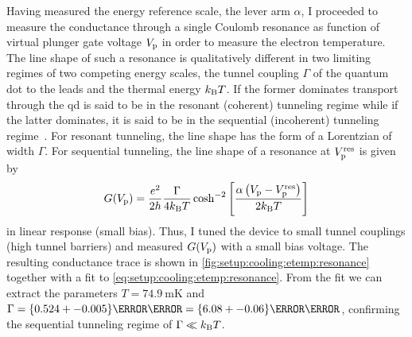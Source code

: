 Having measured the energy reference scale, the lever arm $\alpha$, I proceeded to measure the conductance through a single Coulomb resonance as function of virtual plunger gate voltage $V_{\mathrm{p}}$ in order to measure the electron temperature.
The line shape of such a resonance is qualitatively different in two limiting regimes of two competing energy scales, the tunnel coupling $\Gamma$ of the quantum dot to the leads and the thermal energy $k_{\mathrm{B}} T$.
If the former dominates transport through the \gls{qd} is said to be in the resonant (coherent) tunneling regime while if the latter dominates, it is said to be in the sequential (incoherent) tunneling regime~\cite{Beenakker1991,Ihn2009}.
For resonant tunneling, the line shape has the form of a Lorentzian of width $\Gamma$.
For sequential tunneling, the line shape of a resonance at $V_{\mathrm{p}}^{\mathrm{res}}$ is given by~\cite{Beenakker1991}
\begin{equation}\label{eq:setup:cooling:etemp:resonance}
    G(V_{\mathrm{p}}) = \frac{e^2}{2h}\frac{\Gamma}{4k_{\mathrm{B}} T}\cosh^{-2}\left[\frac{\alpha\left(V_{\mathrm{p}} - V_{\mathrm{p}}^{\mathrm{res}}\right)}{2k_{\mathrm{B}} T}\right]
\end{equation}
in linear response (small bias).
Thus, I tuned the device to small tunnel couplings (high tunnel barriers) and measured $G(V_{\mathrm{p}})$ with a small bias voltage.
The resulting conductance trace is shown in \cref{fig:setup:cooling:etemp:resonance} together with a fit to \cref{eq:setup:cooling:etemp:resonance}.
From the fit we can extract the parameters $T = \qty{74.9}{\milli\kelvin}$ and $\Gamma = \qty{0.524+-0.005}{\micro\eV} = \qty{6.08+-0.06}{\milli\kelvin}$, confirming the sequential tunneling regime of $\Gamma\ll k_{\mathrm{B}} T$.
